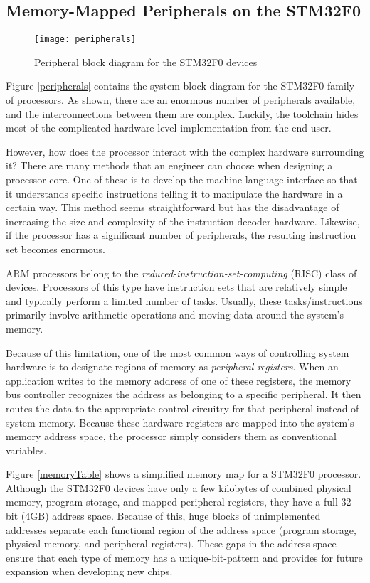 \documentclass[11pt,fleqn]{book} %
\begin{document}
\subsection{Memory-Mapped Peripherals on the STM32F0}

\begin{figure}[]
    \centering\texttt{[image: peripherals]}
    \caption{Peripheral block diagram for the STM32F0 devices}
    \label{peripherals}
\end{figure}

Figure \vref{peripherals} contains the system block diagram for the STM32F0 family of processors. As shown, there are an enormous number of peripherals available, and the interconnections between them are complex. Luckily, the toolchain hides most of the complicated hardware-level implementation from the end user.

However, how does the processor interact with the complex hardware surrounding it? There are many methods that an engineer can choose when designing a processor core. One of these is to develop the machine language interface so that it understands specific instructions telling it to manipulate the hardware in a certain way. This method seems straightforward but has the disadvantage of increasing the size and complexity of the instruction decoder hardware. Likewise, if the processor has a significant number of peripherals, the resulting instruction set becomes enormous. 

ARM processors belong to the \textit{reduced-instruction-set-computing} (RISC) class of devices. Processors of this type have instruction sets that are relatively simple and typically perform a limited number of tasks. Usually, these tasks/instructions primarily involve arithmetic operations and moving data around the system's memory.

Because of this limitation, one of the most common ways of controlling system hardware is to designate regions of memory as \textit{peripheral registers}. When an application writes to the memory address of one of these registers, the memory bus controller recognizes the address as belonging to a specific peripheral. It then routes the data to the appropriate control circuitry for that peripheral instead of system memory. Because these hardware registers are mapped into the system's memory address space, the processor simply considers them as conventional variables. 

Figure \vref{memoryTable} shows a simplified memory map for a STM32F0 processor. Although the STM32F0 devices have only a few kilobytes of combined physical memory, program storage, and mapped peripheral registers, they have a full 32-bit (4GB) address space. Because of this, huge blocks of unimplemented addresses separate each functional region of the address space (program storage, physical memory, and peripheral registers). These gaps in the address space ensure that each type of memory has a unique-bit-pattern and provides for future expansion when developing new chips. 
\end{document}
